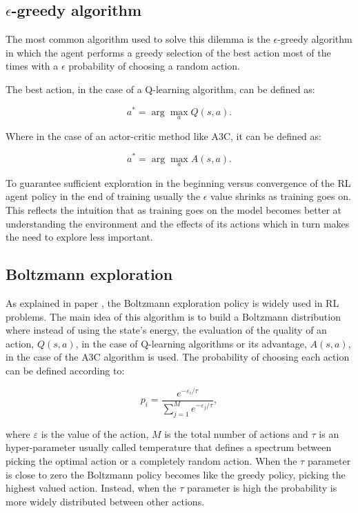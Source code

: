 \subsection{$\epsilon$-greedy algorithm}
\noindent The most common algorithm used to solve this dilemma is the $\epsilon$-greedy algorithm in which the agent performs a greedy selection of the best action most of the times with a $\epsilon$ probability of choosing a random action.

The best action, in the case of a Q-learning algorithm, can be defined as:

\begin{equation}
    a^* =\arg\max\limits_{a} Q(s, a).
\end{equation}

Where in the case of an actor-critic method like A3C, it can be defined as:

\begin{equation}
    a^* =\arg\max\limits_{a} A(s, a).
\end{equation}

To guarantee sufficient exploration in the beginning versus convergence of the \acrshort{RL} agent policy in the end of training usually the $\epsilon$ value shrinks as training goes on. This reflects the intuition that as training goes on the model becomes better at understanding the environment and the effects of its actions which in turn makes the need to explore less important.

\subsection{Boltzmann exploration} \label{boltz}
\noindent As explained in paper \cite{boltz}, the Boltzmann exploration policy is widely used in \acrshort{RL} problems. The main idea of this algorithm is to build a Boltzmann distribution where instead of using the state's energy, the evaluation of the quality of an action, $Q(s,a)$, in the case of Q-learning algorithms or its advantage, $A(s,a)$, in the case of the \acrshort{A3C} algorithm is used. The probability of choosing each action can be defined according to:

\begin{equation}
    p_i = \frac{e^{-\varepsilon_i/\tau}}{\sum\limits_{j=1}^M e^{-\varepsilon_j/\tau}},
\end{equation}

where $\varepsilon$ is the value of the action, $M$ is the total number of actions and $\tau$ is an hyper-parameter usually called temperature that defines a spectrum between picking the optimal action or a completely random action. When the $\tau$ parameter is close to zero the Boltzmann policy becomes like the greedy policy, picking the highest valued action. Instead, when the $\tau$ parameter is high the probability is more widely distributed between other actions. 


